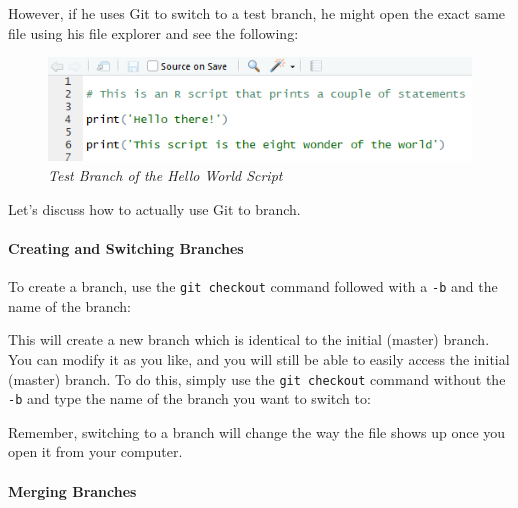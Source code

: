 \documentclass[]{book}
\newenvironment{Shaded}{\begin{snugshade}}{\end{snugshade}}
\newcommand{\StringTok}[1]{\textcolor[rgb]{0.31,0.60,0.02}{#1}}
\newcommand{\OperatorTok}[1]{\textcolor[rgb]{0.81,0.36,0.00}{\textbf{#1}}}
\newcommand{\NormalTok}[1]{#1}
\let\oldparagraph\paragraph
\renewcommand{\paragraph}[1]{\oldparagraph{#1}\mbox{}}
\begin{document}
However, if he uses Git to switch to a test branch, he might open the
exact same file using his file explorer and see the following:

\begin{figure}
\centering
\includegraphics{images/hello2.PNG}
\caption{\emph{Test Branch of the Hello World Script}}
\end{figure}

Let's discuss how to actually use Git to branch.

\paragraph{Creating and Switching
Branches}\label{creating-and-switching-branches}

To create a branch, use the \texttt{git\ checkout} command followed with
a \texttt{-b} and the name of the branch:

\begin{Shaded}
\end{Shaded}

This will create a new branch which is identical to the initial (master)
branch. You can modify it as you like, and you will still be able to
easily access the initial (master) branch. To do this, simply use the
\texttt{git\ checkout} command without the \texttt{-b} and type the name
of the branch you want to switch to:

\begin{Shaded}
\end{Shaded}

Remember, switching to a branch will change the way the file shows up
once you open it from your computer.

\paragraph{Merging Branches}\label{merging-branches}
\end{document}
